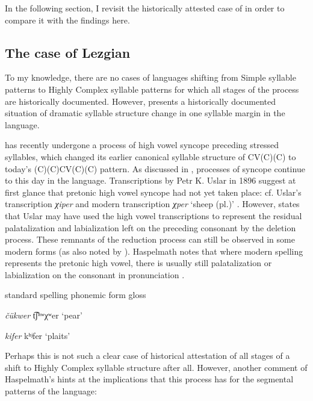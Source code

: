   In the following section, I revisit the historically attested case of  in order to compare it with the findings here.

\subsection{The case of Lezgian}\label{sec:8.4.4}

  To my knowledge, there are no cases of languages shifting from Simple syllable patterns to Highly Complex syllable patterns for which all stages of the process are historically documented. However,  presents a historically documented situation of dramatic syllable structure change in one syllable margin in the language.

   has recently undergone a process of high vowel syncope preceding stressed syllables, which changed its earlier canonical syllable structure of CV(C)(C) to today’s (C)(C)CV(C)(C) pattern. As discussed in , processes of syncope continue to this day in the language. Transcriptions by Petr K. Uslar in 1896 suggest at first glance that pretonic high vowel syncope had not yet taken place: cf. Uslar’s transcription \textit{χiper} and modern transcription \textit{χper} ‘sheep (pl.)’ \citep[36]{Haspelmath1993}. However, \citet[56]{Haspelmath1993} states that Uslar may have used the high vowel transcriptions to represent the residual palatalization and labialization left on the preceding consonant by the deletion process. These remnants of the reduction process can still be observed in some modern forms (as also noted by \citealt{ChitoranBabaliyeva2007}). Haspelmath notes that where modern spelling represents the pretonic high vowel, there is usually still palatalization or labialization on the consonant in pronunciation .

\ea\label{ex:8.3}

standard spelling  phonemic form  gloss

\textit{čükwer}      t͡ʃʰʷχʷer    ‘pear’

\textit{kifer}      kʰʲfer       ‘plaits’
\citep[37]{Haspelmath1993}
\z

Perhaps this is not such a clear case of historical attestation of all stages of a shift to Highly Complex syllable structure after all. However, another comment of Haspelmath’s hints at the implications that this process has for the segmental patterns of the language:

